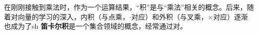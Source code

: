 
在刚刚接触到乘法时，作为一个运算结果，“积”是与“乘法”相关的概念。后来，随着对向量的学习的深入，内积（与点乘，$\cdot$对应）和外积（与叉乘，$\times$对应）逐渐也成为了sh
\textbf{笛卡尔积}是一个集合领域的概念，经常通过对。